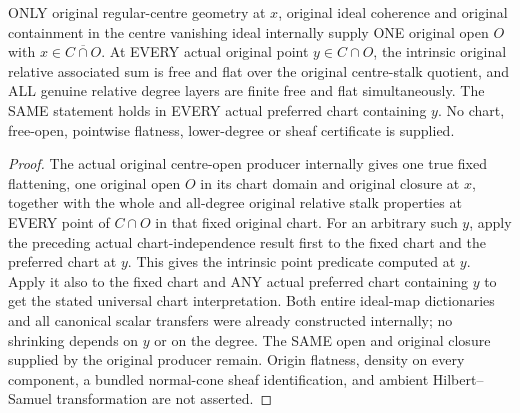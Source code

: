 \begin{theorem}
\label{hir:real-domain-original-intrinsic-all-degree-stalk-freeness-centre-open}
\leanok
ONLY original regular-centre geometry at $x$, original ideal coherence and
original containment in the centre vanishing ideal internally supply ONE
original open $O$ with $x\in\overline{C\cap O}$. At EVERY actual original
point $y\in C\cap O$, the intrinsic original relative associated sum is
free and flat over the original centre-stalk quotient, and ALL genuine
relative degree layers are finite free and flat simultaneously. The SAME
statement holds in EVERY actual preferred chart containing $y$. No chart,
free-open, pointwise flatness, lower-degree or sheaf certificate is supplied.
\end{theorem}
\begin{proof}
The actual original centre-open producer internally gives one true fixed
flattening, one original open $O$ in its chart domain and original closure
at $x$, together with the whole and all-degree original relative stalk
properties at EVERY point of $C\cap O$ in that fixed original chart.
For an arbitrary such $y$, apply the preceding actual chart-independence
result first to the fixed chart and the preferred chart at $y$. This gives
the intrinsic point predicate computed at $y$. Apply it also to the fixed
chart and ANY actual preferred chart containing $y$ to get the stated
universal chart interpretation. Both entire ideal-map dictionaries and
all canonical scalar transfers were already constructed internally; no
shrinking depends on $y$ or on the degree. The SAME open and original
closure supplied by the original producer remain. Origin flatness,
density on every component, a bundled normal-cone sheaf identification,
and ambient Hilbert--Samuel transformation are not asserted.
\end{proof}
